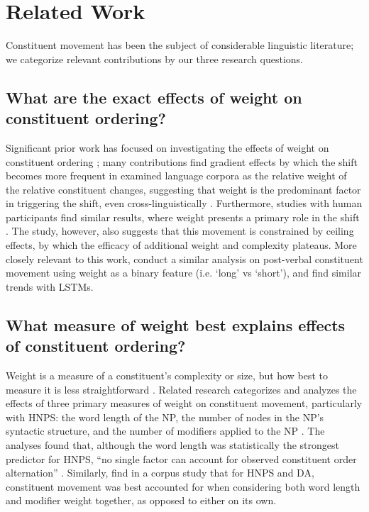 \section{Related Work}
Constituent movement has been the subject of considerable linguistic literature; we categorize relevant contributions by our three research questions.

\subsection{What are the exact effects of weight on constituent ordering?}

Significant prior work has focused on investigating the effects of weight on constituent ordering \cite{arnold_et_al, Wasow_Arnold_2003, Wasow_endweight, ARNOLD200455, Hawkins_1995, 1909bezie, hawkins2004}; many contributions find gradient effects by which the shift becomes more frequent in examined language corpora as the relative weight of the relative constituent changes, suggesting that weight is the predominant factor in triggering the shift, even cross-linguistically \cite{Wasow_1997, Wasow_Arnold_2003, faghiri, WangLiu, Hawkins_1999, quirketal, Manetta2012ReconsideringRS}. Furthermore, studies with human participants find similar results, where weight presents a primary role in the shift \cite{Medeiros_Mains_McGowan_2021}. The study, however, also suggests that this movement is constrained by ceiling effects, by which the efficacy of additional weight and complexity plateaus. More closely relevant to this work, \citet{futrell2018rnnslearnhumanlikeabstract} conduct a similar analysis on post-verbal constituent movement using weight as a binary feature (i.e. `long' vs `short'), and find similar trends with LSTMs. 

\subsection{What measure of weight best explains effects of constituent ordering?}

Weight is a measure of a constituent's complexity or size, but how best to measure it is less straightforward \cite{logstruct, haegeman1991, Wasow_endweight}. Related research categorizes and analyzes the effects of three primary measures of weight on constituent movement, particularly with HNPS: the word length of the NP, the number of nodes in the NP's syntactic structure, and the number of modifiers applied to the NP \cite{Wasow_Arnold_2003, Medeiros_Mains_McGowan_2021, Wasow_1997}. The analyses found that, although the word length was statistically the strongest predictor for HNPS, ``no single factor can account for observed constituent order alternation'' \cite[~pg.6]{Medeiros_Mains_McGowan_2021}. Similarly, \citet{Wasow_Arnold_2003} find in a corpus study that for HNPS and DA, constituent movement was best accounted for when considering both word length and modifier weight together, as opposed to either on its own.

